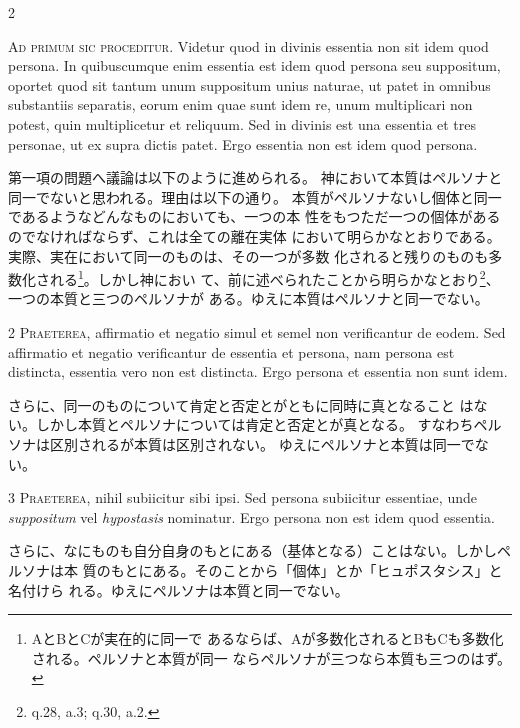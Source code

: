 \documentclass[paper=a4paper,fontsize=10pt,jafontsize=9pt,titlepage]{jlreq}
\begin{document}
\begin{paracol}{2}

{\Huge A}{\scshape d primum sic proceditur}. Videtur quod in divinis essentia non sit idem
quod persona. In quibuscumque enim essentia est idem quod persona seu
suppositum, oportet quod sit tantum unum suppositum unius naturae, ut
patet in omnibus substantiis separatis, eorum enim quae sunt idem re,
unum multiplicari non potest, quin multiplicetur et reliquum. Sed in
divinis est una essentia et tres personae, ut ex supra dictis
patet. Ergo essentia non est idem quod persona.

\switchcolumn

第一項の問題へ議論は以下のように進められる。
神において本質はペルソナと同一でないと思われる。理由は以下の通り。
本質がペルソナないし個体と同一であるようなどんなものにおいても、一つの本
 性をもつただ一つの個体があるのでなければならず、これは全ての離在実体
 において明らかなとおりである。実際、実在において同一のものは、その一つが多数
 化されると残りのものも多数化される\footnote{AとBとCが実在的に同一で
 あるならば、Aが多数化されるとBもCも多数化される。ペルソナと本質が同一
 ならペルソナが三つなら本質も三つのはず。}。しかし神におい
 て、前に述べられたことから明らかなとおり\footnote{q.28, a.3; q.30, a.2.}、一つの本質と三つのペルソナが
 ある。ゆえに本質はペルソナと同一でない。

\switchcolumn*

2 {\scshape Praeterea}, affirmatio et negatio simul et semel non verificantur de
eodem. Sed affirmatio et negatio verificantur de essentia et persona,
nam persona est distincta, essentia vero non est distincta. Ergo persona
et essentia non sunt idem.

\switchcolumn

さらに、同一のものについて肯定と否定とがともに同時に真となること
 はない。しかし本質とペルソナについては肯定と否定とが真となる。
すなわちペルソナは区別されるが本質は区別されない。
ゆえにペルソナと本質は同一でない。

\switchcolumn*

3 {\scshape Praeterea}, nihil subiicitur sibi ipsi. Sed persona subiicitur essentiae,
unde {\itshape suppositum} vel {\itshape hypostasis} nominatur. Ergo persona non est idem quod
essentia.

\switchcolumn

さらに、なにものも自分自身のもとにある（基体となる）ことはない。しかしペルソナは本
 質のもとにある。そのことから「個体」とか「ヒュポスタシス」と名付けら
 れる。ゆえにペルソナは本質と同一でない。


\end{paracol}
\end{document}
